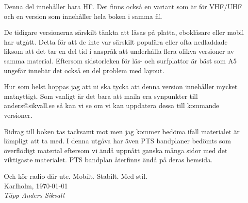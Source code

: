 Denna del innehåller bara HF. Det finns också en variant som är för VHF/UHF och
en version som innehåller hela boken i samma fil.

De tidigare versionerna särskilt tänkta att läsas på platta, ebokläsare eller
mobil har utgått. Detta för att de inte var särskilt populära eller ofta
nedladdade liksom att det tar en del tid i anspråk att underhålla flera olikva
versioner av samma material. Eftersom sidstorleken för läs- och surfplattor är
bäst som A5 ungefär innebär det också en del problem med layout.

Hur som helst hoppas jag att ni ska tycka att denna version innehåller mycket
matnyttigt. Som vanligt är det bara att maila era synpunkter till
anders@sikvall.se så kan vi se om vi kan uppdatera dessa till kommande
versioner.

Bidrag till boken tas tacksamt mot men jag kommer bedöma ifall materialet är
lämpligt att ta med. I denna utgåva har även PTS bandplaner bedömts som
överflödigt material eftersom vi ändå uppnått ganska många sidor med det
viktigaste materialet. PTS bandplan återfinns ändå på deras hemsida.

Och kör radio där ute. Mobilt. Stabilt. Med stil.\\[4em]

Karlholm, \today\\
\textit{Täpp-Anders Sikvall}

\clearpage
